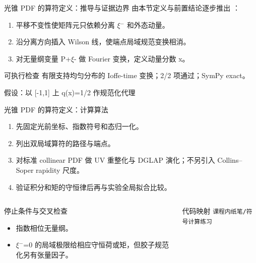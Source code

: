 \begin{frame}[t]{光锥 PDF 的算符定义：推导与证据边界}
\footnotesize
{}\quad 由本节定义与前置结论逐步推出 ：
\begin{enumerate}
\item 平移不变性使矩阵元只依赖分离 \ensuremath{\xi}\ensuremath{^{-}} 和外态动量。
\item 沿分离方向插入 Wilson 线，使端点局域规范变换相消。
\item 对无量纲变量 P+\ensuremath{\xi}- 做 Fourier 变换，定义动量分数 x。
\end{enumerate}\begin{block}{可执行检查}
\quad 有限支持均匀分布的 Ioffe-time 变换；2/2 项通过；SymPy exact。
\par\scriptsize 假设：以 [-1,1] 上 q(x)=1/\allowbreak{}2 作规范化代理
\end{block}
\end{frame}

\begin{frame}[t]{光锥 PDF 的算符定义：计算算法}
\footnotesize
{}\begin{enumerate}
\item 先固定光前坐标、指数符号和态归一化。
\item 列出双局域算符的路径与端点。
\item 对标准 collinear PDF 做 UV 重整化与 DGLAP 演化；不另引入 Collins--Soper rapidity 尺度。
\item 验证积分和矩的守恒律后再与实验全局拟合比较。
\end{enumerate}\begin{columns}[T,onlytextwidth]
\begin{block}{停止条件与交叉检查}\scriptsize\begin{itemize}
\item[\CheckMark] 指数相位无量纲。
\item[\CheckMark] \ensuremath{\xi}\ensuremath{^{-}}=0 的局域极限给相应守恒荷或矩，但胶子规范化另有张量因子。
\end{itemize}\end{block}
\begin{block}{代码映射}
\scriptsize \texttt{课程内纸笔/\allowbreak{}符号计算练习}
\end{block}\end{columns}\end{frame}


